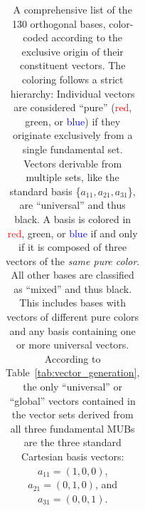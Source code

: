 \documentclass[%
  reprint,
  superscriptaddress,
  showpacs,
  showkeys,
  amsmath,amssymb,
  pra,
  longbibliography,
  floatfix,
  x11names
]{revtex4-2}
\begin{document}
\begin{table}[htbp!]
\caption{
A comprehensive list of the 130 orthogonal bases, color-coded according to the exclusive origin of their constituent vectors.
The coloring follows a strict hierarchy:
Individual vectors are considered ``pure'' (\textcolor{red}{red}, \textcolor{green!40!black}{green}, or \textcolor{blue}{blue})
if they originate exclusively from a single fundamental set.
Vectors derivable from multiple sets, like the standard basis \{$a_{11}, a_{21}, a_{31}$\}, are ``universal'' and thus black.
A basis is colored in \textcolor{red}{red}, \textcolor{green!40!black}{green}, or \textcolor{blue}{blue} if and only if it is composed of three vectors
of the \textit{same pure color}.
All other bases are classified as ``mixed'' and thus black.
This includes bases with vectors of different pure colors and any basis containing one or more universal vectors.
According to Table~\ref{tab:vector_generation}, the only ``universal'' or ``global'' vectors contained
in the vector sets derived from all three fundamental MUBs are the three standard Cartesian basis vectors:
$a_{11}=(1,0,0)$, $a_{21}=(0,1,0)$, and $a_{31}=(0,0,1)$.
}
\label{tab:orthogonal_bases}
\begin{ruledtabular}
\begin{tabular}{ccccccc} %


\end{tabular}
\end{ruledtabular}
\end{table}
\end{document}
